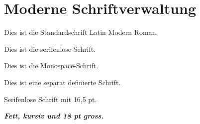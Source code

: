 \documentclass[11pt,a4paper]{scrartcl}
\begin{document}
\section{Moderne Schriftverwaltung}

Dies ist die Standardschrift
Latin Modern Roman.

\bigskip

{\sffamily
Dies ist die serifenlose Schrift.\par}

\bigskip

{\ttfamily
Dies ist die Monospace-Schrift.\par}

\bigskip

{\MeineSchrift
Dies ist eine separat definierte Schrift.\par}

\bigskip

{\MeineSchrift
 \fontsize{16.5pt}{20pt}\selectfont
 Serifenlose Schrift mit 16,5 pt.\par}

\bigskip

{\bfseries\itshape
 \fontsize{18pt}{22pt}\selectfont
 Fett, kursiv und 18 pt gross.\par}
\end{document}
